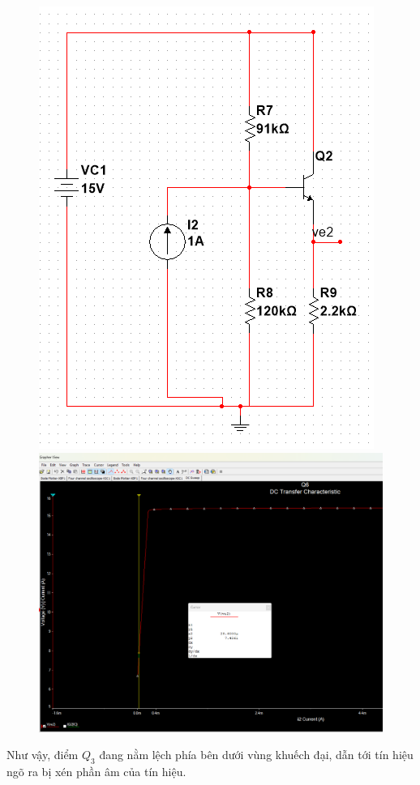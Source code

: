 \begin{itemize}[label=-]
	\begin{figure}[H]
		\centering
		\begin{minipage}{.4\linewidth}
			\includegraphics[width=\linewidth]{./my-chapters/my-images/Question6/d_phancuctang3_mach.png}
		\end{minipage}
		\begin{minipage}{.4\linewidth}
			\includegraphics[width=.9\linewidth]{./my-chapters/my-images/Question6/d_phancuctang3.png}
		\end{minipage}
	\end{figure}
	
	Như vậy, điểm $Q_{3}$ đang nằm lệch phía bên dưới vùng khuếch đại, dẫn tới tín hiệu ngõ ra bị xén phần âm của tín hiệu.
	
\end{itemize}